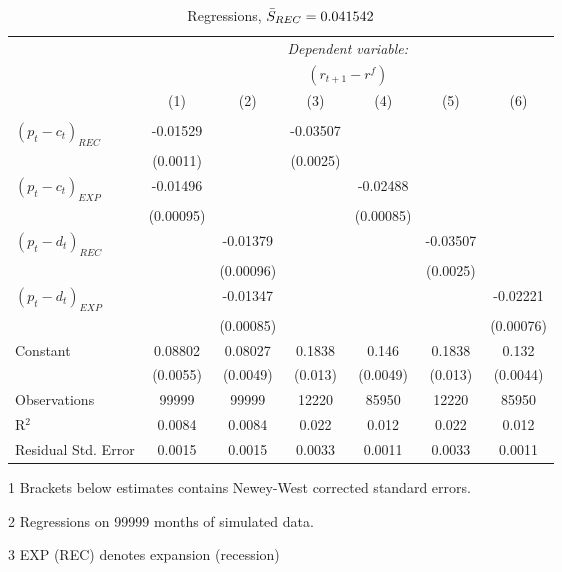 \begin{table}[H]
\centering   
  \caption{Regressions, $\Bar{S}_{REC} = 0.041542$}           
  \label{tab:regress1}     
  \begin{threeparttable}
\begin{tabular}{@{\hspace{5pt}}l@{\hspace{5pt}}cccccc} 
\toprule 
 & \multicolumn{6}{c}{\textit{Dependent variable:}} \\ 
 & \multicolumn{6}{c}{$\left(r_{t+1}-r^f\right)$} \\ 
 \cmidrule(rr){2-7}
 & (1) & (2) & (3) & (4) & (5) & (6) \\ 
\midrule  
\\[-2.1ex] $\left( p_t - c_t \right)_{REC}$ &-0.01529& &-0.03507 & & &\\ 
  & (0.0011) & &(0.0025) & & & \\ 
 \addlinespace 
  $\left( p_t - c_t \right)_{EXP}$ &-0.01496  &    & &-0.02488 & &  \\ 
  & (0.00095) & & &(0.00085) & & \\ 
 \addlinespace 
  $\left( p_t - d_t \right)_{REC}$ & &-0.01379& & & -0.03507  &   \\ 
                                   & &  (0.00096) & & & (0.0025) &    \\ 
 \addlinespace 
  $\left( p_t - d_t \right)_{EXP}$ & &   -0.01347& & & &-0.02221 \\ 
                                   & &  (0.00085) & & & &(0.00076) \\ 
 \addlinespace 
 Constant &0.08802 &0.08027&0.1838 &0.146 &0.1838 &0.132 \\ 
          &(0.0055) &(0.0049)&(0.013)&(0.0049)&(0.013)&(0.0044) \\ 
 \addlinespace 
\midrule  
Observations & 99999 & 99999&12220 & 85950&12220&85950\\
R$^{2}$ &0.0084 & 0.0084&0.022&0.012&0.022&0.012 \\ 
Residual Std. Error &0.0015 & 0.0015&0.0033&0.0011&0.0033&0.0011 \\ 
\bottomrule 
\end{tabular} 
\begin{tablenotes}
\footnotesize{
\item[1] Brackets below estimates contains Newey-West corrected standard errors. 
\item[2] Regressions on 99999 months of simulated data.
\item[3] EXP (REC) denotes expansion (recession)
}
\end{tablenotes}
\end{threeparttable}
\end{table} 
